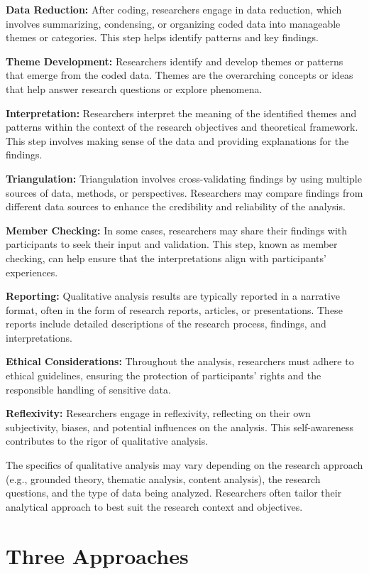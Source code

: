 \documentclass[
  b5paper]{book}
\begin{document}
\textbf{Data Reduction:} After coding, researchers engage in data reduction, which involves summarizing, condensing, or organizing coded data into manageable themes or categories. This step helps identify patterns and key findings.

\textbf{Theme Development:} Researchers identify and develop themes or patterns that emerge from the coded data. Themes are the overarching concepts or ideas that help answer research questions or explore phenomena.

\textbf{Interpretation:} Researchers interpret the meaning of the identified themes and patterns within the context of the research objectives and theoretical framework. This step involves making sense of the data and providing explanations for the findings.

\textbf{Triangulation:} Triangulation involves cross-validating findings by using multiple sources of data, methods, or perspectives. Researchers may compare findings from different data sources to enhance the credibility and reliability of the analysis.

\textbf{Member Checking:} In some cases, researchers may share their findings with participants to seek their input and validation. This step, known as member checking, can help ensure that the interpretations align with participants' experiences.

\textbf{Reporting:} Qualitative analysis results are typically reported in a narrative format, often in the form of research reports, articles, or presentations. These reports include detailed descriptions of the research process, findings, and interpretations.

\textbf{Ethical Considerations:} Throughout the analysis, researchers must adhere to ethical guidelines, ensuring the protection of participants' rights and the responsible handling of sensitive data.

\textbf{Reflexivity:} Researchers engage in reflexivity, reflecting on their own subjectivity, biases, and potential influences on the analysis. This self-awareness contributes to the rigor of qualitative analysis.

The specifics of qualitative analysis may vary depending on the research approach (e.g., grounded theory, thematic analysis, content analysis), the research questions, and the type of data being analyzed. Researchers often tailor their analytical approach to best suit the research context and objectives.

\hypertarget{three-approaches}{%
\section{Three Approaches}\label{three-approaches}}
\end{document}
